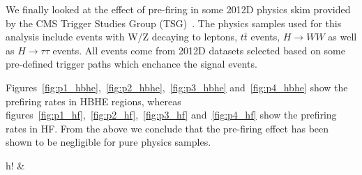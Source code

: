 \documentclass[11pt]{cmspaperpdf}
\begin{document}
We finally looked at the effect of pre-firing in some 2012D physics skim provided by the CMS Trigger Studies Group (TSG)~\cite{tsg}. The physics samples used for this analysis include events with W/Z decaying to leptons, $t \bar{t}$ events, $H \rightarrow WW$ as well as $H \rightarrow \tau\tau$ events. All events come from 2012D datasets selected based on some pre-defined trigger paths which enchance the signal events.

Figures~\ref{fig:p1_hbhe},~\ref{fig:p2_hbhe},~\ref{fig:p3_hbhe} and~\ref{fig:p4_hbhe} show the prefiring rates in HBHE regions, whereas figures~\ref{fig:p1_hf},~\ref{fig:p2_hf},~\ref{fig:p3_hf} and~\ref{fig:p4_hf} show the prefiring rates in HF. From the above we conclude that the pre-firing effect has been shown to be negligible for pure physics samples.

\begin{2figures}{h!}
\centering
{} &

\end{2figures}
\end{document}

